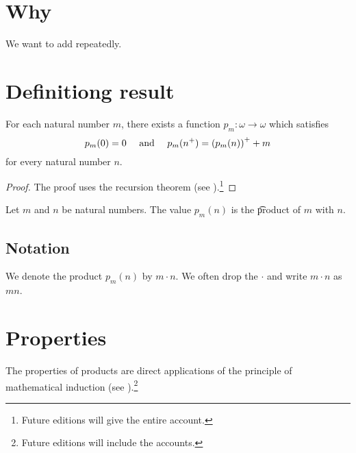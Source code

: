 
\section*{Why}

We want to add repeatedly.

\section*{Definitiong result}

\begin{proposition}
For each natural number $m$, there exists a function $p_m: \omega  \to \omega $ which satisfies
\[
p_m(0) = 0 \quad \text{ and } \quad p_m({n}^{+}) = {(p_m(n))}^{+} + m
\]
for every natural number $n$.
\end{proposition}

\begin{proof}The proof uses the recursion theorem (see ).\footnote{Future editions will give the entire account.}\end{proof}
Let $m$ and $n$ be natural numbers.
The value $p_m(n)$ is the \t{product} of $m$ with $n$.

% 

\subsection*{Notation}

We denote the product $p_m(n)$ by $m \cdot  n$.
We often drop the $\cdot $ and write $m \cdot  n$ as $mn$.


\section*{Properties}

The properties of products are direct applications of the principle of mathematical induction (see ).\footnote{Future editions will include the accounts.}

